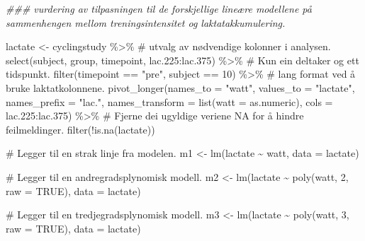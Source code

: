 \documentclass[
  letterpaper,
  DIV=11,
  numbers=noendperiod]{scrartcl}
\newenvironment{Shaded}{\begin{snugshade}}{\end{snugshade}}
\newcommand{\AttributeTok}[1]{\textcolor[rgb]{0.40,0.45,0.13}{#1}}
\newcommand{\CommentTok}[1]{\textcolor[rgb]{0.37,0.37,0.37}{#1}}
\newcommand{\ConstantTok}[1]{\textcolor[rgb]{0.56,0.35,0.01}{#1}}
\newcommand{\DecValTok}[1]{\textcolor[rgb]{0.68,0.00,0.00}{#1}}
\newcommand{\DocumentationTok}[1]{\textcolor[rgb]{0.37,0.37,0.37}{\textit{#1}}}
\newcommand{\FloatTok}[1]{\textcolor[rgb]{0.68,0.00,0.00}{#1}}
\newcommand{\FunctionTok}[1]{\textcolor[rgb]{0.28,0.35,0.67}{#1}}
\newcommand{\NormalTok}[1]{\textcolor[rgb]{0.00,0.23,0.31}{#1}}
\newcommand{\OtherTok}[1]{\textcolor[rgb]{0.00,0.23,0.31}{#1}}
\newcommand{\SpecialCharTok}[1]{\textcolor[rgb]{0.37,0.37,0.37}{#1}}
\newcommand{\StringTok}[1]{\textcolor[rgb]{0.13,0.47,0.30}{#1}}
\begin{document}
\begin{Shaded}
\begin{Highlighting}[]
\DocumentationTok{\#\#\# vurdering av tilpasningen til de forskjellige lineære modellene på sammenhengen mellom treningsintensitet og laktatakkumulering.}

\NormalTok{lactate }\OtherTok{\textless{}{-}}\NormalTok{ cyclingstudy }\SpecialCharTok{\%\textgreater{}\%}
  \CommentTok{\# utvalg av nødvendige kolonner i analysen.}
  \FunctionTok{select}\NormalTok{(subject, group, timepoint, lac}\FloatTok{.225}\SpecialCharTok{:}\NormalTok{lac}\FloatTok{.375}\NormalTok{) }\SpecialCharTok{\%\textgreater{}\%}
  \CommentTok{\# Kun ein deltaker og ett tidspunkt.}
  \FunctionTok{filter}\NormalTok{(timepoint }\SpecialCharTok{==} \StringTok{"pre"}\NormalTok{, subject }\SpecialCharTok{==} \DecValTok{10}\NormalTok{) }\SpecialCharTok{\%\textgreater{}\%}
  \CommentTok{\# lang format ved å bruke laktatkolonnene.}
  \FunctionTok{pivot\_longer}\NormalTok{(}\AttributeTok{names\_to =} \StringTok{"watt"}\NormalTok{,}
               \AttributeTok{values\_to =} \StringTok{"lactate"}\NormalTok{,}
               \AttributeTok{names\_prefix =} \StringTok{"lac."}\NormalTok{,}
               \AttributeTok{names\_transform =} \FunctionTok{list}\NormalTok{(}\AttributeTok{watt =}\NormalTok{ as.numeric),}
               \AttributeTok{cols =}\NormalTok{ lac}\FloatTok{.225}\SpecialCharTok{:}\NormalTok{lac}\FloatTok{.375}\NormalTok{) }\SpecialCharTok{\%\textgreater{}\%}
  \CommentTok{\# Fjerne dei ugyldige veriene NA for å hindre feilmeldinger.}
  \FunctionTok{filter}\NormalTok{(}\SpecialCharTok{!}\FunctionTok{is.na}\NormalTok{(lactate))}

\CommentTok{\# Legger til en strak linje fra modelen.}
\NormalTok{m1 }\OtherTok{\textless{}{-}} \FunctionTok{lm}\NormalTok{(lactate }\SpecialCharTok{\textasciitilde{}}\NormalTok{ watt, }\AttributeTok{data =}\NormalTok{ lactate)}

\CommentTok{\# Legger til en andregradsplynomisk modell.}
\NormalTok{m2 }\OtherTok{\textless{}{-}} \FunctionTok{lm}\NormalTok{(lactate }\SpecialCharTok{\textasciitilde{}} \FunctionTok{poly}\NormalTok{(watt, }\DecValTok{2}\NormalTok{, }\AttributeTok{raw =} \ConstantTok{TRUE}\NormalTok{), }\AttributeTok{data =}\NormalTok{ lactate)}

\CommentTok{\# Legger til en tredjegradsplynomisk modell.}
\NormalTok{m3 }\OtherTok{\textless{}{-}} \FunctionTok{lm}\NormalTok{(lactate }\SpecialCharTok{\textasciitilde{}} \FunctionTok{poly}\NormalTok{(watt, }\DecValTok{3}\NormalTok{, }\AttributeTok{raw =} \ConstantTok{TRUE}\NormalTok{), }\AttributeTok{data =}\NormalTok{ lactate)}


\end{Highlighting}
\end{Shaded}
\end{document}
